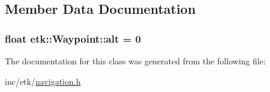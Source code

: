\subsection{Member Data Documentation}
\hypertarget{classetk_1_1_waypoint_a9602058eaab556f8db26b663fae161e9}{
\subsubsection[{alt}]{\setlength{\rightskip}{0pt plus 5cm}float etk\-::\-Waypoint\-::alt = 0\hspace{0.3cm}{\ttfamily [protected]}}}\label{classetk_1_1_waypoint_a9602058eaab556f8db26b663fae161e9}


The documentation for this class was generated from the following file\-:\begin{DoxyCompactItemize}
\item 
inc/etk/\hyperlink{navigation_8h}{navigation.\-h}\end{DoxyCompactItemize}
